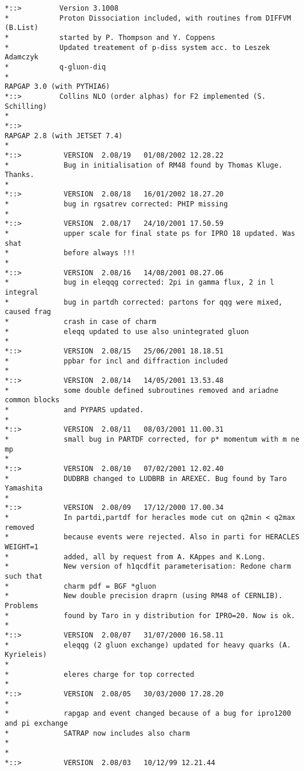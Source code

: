 \documentclass[10pt]{article} \usepackage{dina4}
\begin{document}
\begin{verbatim}
*::>         Version 3.1008
*            Proton Dissociation included, with routines from DIFFVM (B.List)
*            started by P. Thompson and Y. Coppens
*            Updated treatement of p-diss system acc. to Leszek Adamczyk
*            q-gluon-diq        
*
RAPGAP 3.0 (with PYTHIA6)
*::>         Collins NLO (order alphas) for F2 implemented (S. Schilling)
*
*::>          
RAPGAP 2.8 (with JETSET 7.4)
*
*::>          VERSION  2.08/19   01/08/2002 12.28.22
*             Bug in initialisation of RM48 found by Thomas Kluge. Thanks.
*
*::>          VERSION  2.08/18   16/01/2002 18.27.20
*             bug in rgsatrev corrected: PHIP missing
*
*::>          VERSION  2.08/17   24/10/2001 17.50.59
*             upper scale for final state ps for IPRO 18 updated. Was shat
*             before always !!!
*
*::>          VERSION  2.08/16   14/08/2001 08.27.06
*             bug in eleqqg corrected: 2pi in gamma flux, 2 in l integral
*             bug in partdh corrected: partons for qqg were mixed, caused frag
*             crash in case of charm
*             eleqq updated to use also unintegrated gluon
*
*::>          VERSION  2.08/15   25/06/2001 18.18.51
*             ppbar for incl and diffraction included
*
*::>          VERSION  2.08/14   14/05/2001 13.53.48
*             some double defined subroutines removed and ariadne common blocks
*             and PYPARS updated.
*
*::>          VERSION  2.08/11   08/03/2001 11.00.31
*             small bug in PARTDF corrected, for p* momentum with m ne mp
*
*::>          VERSION  2.08/10   07/02/2001 12.02.40
*             DUDBRB changed to LUDBRB in AREXEC. Bug found by Taro Yamashita
*
*::>          VERSION  2.08/09   17/12/2000 17.00.34
*             In partdi,partdf for heracles mode cut on q2min < q2max removed
*             because events were rejected. Also in parti for HERACLES WEIGHT=1
*             added, all by request from A. KAppes and K.Long.
*             New version of h1qcdfit parameterisation: Redone charm such that
*             charm pdf = BGF *gluon
*             New double precision draprn (using RM48 of CERNLIB). Problems
*             found by Taro in y distribution for IPRO=20. Now is ok.
*
*::>          VERSION  2.08/07   31/07/2000 16.58.11
*             eleqqg (2 gluon exchange) updated for heavy quarks (A. Kyrieleis)
*
*             eleres charge for top corrected
*
*::>          VERSION  2.08/05   30/03/2000 17.28.20
*
*             rapgap and event changed because of a bug for ipro1200 and pi exchange
*             SATRAP now includes also charm
*
*
*::>          VERSION  2.08/03   10/12/99 12.21.44

\end{verbatim}
\end{document}
